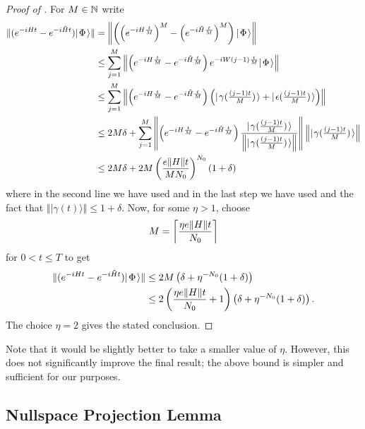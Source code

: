 \documentclass[../thesis-main/thesis-main]{subfiles}
\begin{document}
\begin{proof}[Proof of {}]
For $M \in \mathbb{N}$ write
\begin{align}
  \|{(e^{-iHt}-e^{-i\tilde{H}t}) |\mspace{2mu} \Phi \mspace{2mu} \rangle}\|
  &= \left\|{\left(\left(e^{-iH\frac{t}{M}}\right)^{M} -
     \left(e^{-i\tilde{H}\frac{t}{M}}\right)^{M}\right) |\mspace{2mu} \Phi \mspace{2mu} \rangle}\right\| \\
  & \leq \sum_{j=1}^{M} \left\|{\left(e^{-iH\frac{t}{M}} - 
     e^{-i\tilde{H}\frac{t}{M}}\right) e^{-iW\left(j-1\right)\frac{t}{M}}
     |\mspace{2mu} \Phi \mspace{2mu} \rangle}\right\| \\
  & \leq \sum_{j=1}^{M} 
    \left\|{\left(e^{-iH\frac{t}{M}} - e^{-i\tilde{H}\frac{t}{M}}\right)
    \left(|\mspace{2mu} \gamma(\tfrac{(j-1)t}{M}) \mspace{2mu} \rangle +
          |\mspace{2mu} \epsilon(\tfrac{(j-1)t}{M}) \mspace{2mu} \rangle\right)}\right\| \\
  & \leq 2M\delta+\sum_{j=1}^{M} 
    \left\|{ \left(e^{-iH\frac{t}{M}} - e^{-i\tilde{H}\frac{t}{M}}\right)
    \frac{|\mspace{2mu} \gamma(\tfrac{(j-1)t}{M}) \mspace{2mu} \rangle} 
         {\left\|{|\mspace{2mu} \gamma(\tfrac{(j-1)t}{M}) \mspace{2mu} \rangle}\right\|}}\right\|
    \left\|{|\mspace{2mu} \gamma(\tfrac{(j-1)t}{M}) \mspace{2mu} \rangle}\right\|\\ 
  & \leq 2M\delta 
    + 2M\left(\frac{e\|{H}\|t}{M N_0}\right)^{N_0}(1+\delta)
\end{align}
where in the second line we have used  and in the last step we have used  and the fact that $\Vert |\gamma(t)\rangle\Vert \leq 1+\delta$.
Now, for some $\eta>1$, choose
\begin{align}
  M= \left\lceil \frac{\eta e\|{H}\|t}{N_0} \right\rceil
\end{align}
for $0<t\leq T$ to get
\begin{align}
  \|{(e^{-iHt}-e^{-i\tilde{H}t}) |\mspace{2mu} \Phi \mspace{2mu} \rangle}\|
  &\leq 2M\left(\delta + \eta^{-N_0}(1+\delta)\right) \\
  &\leq 2\left(\frac{\eta e\|{H}\|t}{N_0} + 1 \right) 
        \left(\delta + \eta^{-N_0}(1+\delta)\right).
\end{align}
The choice $\eta=2$ gives the stated conclusion.
\end{proof}

Note that it would be slightly better to take a smaller value of $\eta$.  However, this does not significantly improve the final result; the above bound is simpler and sufficient for our purposes.

\subsection{Nullspace Projection Lemma}
\end{document}
